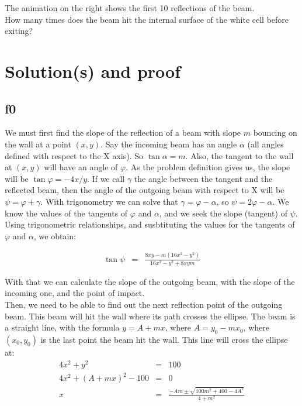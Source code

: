\documentclass[english]{article}
\begin{document}
The animation on the right shows the first 10 reflections of the beam.\\

How many times does the beam hit the internal surface of the white cell before exiting?\\

\section{Solution(s) and proof}

\subsection{f0}

We must first find the slope of the reflection of a beam with slope $m$ bouncing on the wall at a point $(x,y)$. Say the incoming beam has an angle $\alpha$ (all angles defined with respect to the X axis). So $\tan\alpha = m$. Also, the tangent to the wall at $(x,y)$ will have an angle of $\varphi$. As the problem definition gives us, the slope will be $\tan\varphi = -4x/y$. If we call $\gamma$ the angle between the tangent and the reflected beam, then the angle of the outgoing beam with respect to X will be $\psi = \varphi + \gamma$. With trigonometry we can solve that $\gamma = \varphi - \alpha$, so $\psi = 2\varphi - \alpha$. We know the values of the tangents of $\varphi$ and $\alpha$, and we seek the slope (tangent) of $\psi$. Using trigonometric relationships, and susbtituting the values for the tangents of $\varphi$ and $\alpha$, we obtain:

\begin{eqnarray}
\tan \psi &=& \frac{8xy - m(16x^2-y^2)}{16x^2-y^2+8xym} \label{eq:tany}
\end{eqnarray}

With that we can calculate the slope of the outgoing beam, with the slope of the incoming one, and the point of impact.\\

Then, we need to be able to find out the next reflection point of the outgoing beam. This beam will hit the wall where its path crosses the ellipse. The beam is a straight line, with the formula $y = A +mx$, where $A = y_0 - m x_0$, where $(x_0, y_0)$ is the last point the beam hit the wall. This line will cross the ellipse at:\\

\begin{eqnarray}
4x^2 + y^2 &=& 100 \\
4x^2 + (A+mx)^2 - 100 &=& 0\\
x &=& \frac{-Am \pm \sqrt{100m^2 + 400 - 4A^2}}{4+m^2} \label{eq:x}
\end{eqnarray}
\end{document}
